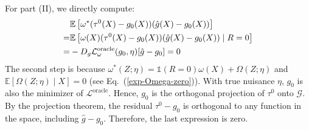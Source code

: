 \documentclass{article}
\theoremstyle{plain}
\theoremstyle{definition}
\theoremstyle{remark}
\newcommand{\E}{\mathbb{E}}                %
\newcommand{\1}{\mathds{1}}                %
\begin{document}
For part (II), we directly compute:
\begin{align}
    \label{part-II}
    &\E\left[\omega^*(\tau^0(X)-g_0(X))(\hat{g}(X)-g_0(X)) \right] \notag \\
    =& \E\left[\omega(X)(\tau^0(X)-g_0(X))(\hat{g}(X)-g_0(X)) \mid R = 0\right] \notag \\
    =& -D_g\mathcal{L}^{\text{oracle}}_\omega(g_0,\eta)[\hat{g} - g_0] =0\\
\end{align}
The second step is because $\omega^*(Z;\eta)=\1(R=0)\omega(X)+\Omega(Z;\eta)$ and $\E\left[\Omega(Z;\eta) \mid X\right] = 0$ (see Eq.~(\ref{exp-Omega-zero})). With true nuisance $\eta$, $g_0$ is also the minimizer of $\mathcal{L}^{\text{oracle}}$. Hence, $g_0$ is the orthogonal projection of $\tau^0$ onto $\mathcal{G}$. By the projection theorem, the residual $\tau^0-g_0$ is orthogonal to any function in the space, including $\hat{g}-g_0$. Therefore, the last expression is zero.
\end{document}
